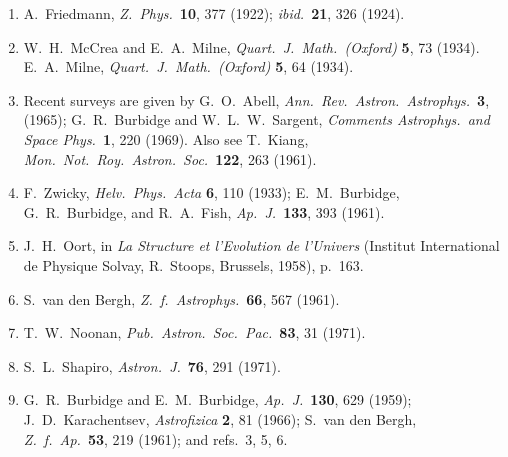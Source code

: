 \begin{enumerate}
  \item{}\label{ch15-ref-1}
  A.~Friedmann, \emph{Z.\ Phys.}\ \textbf{10}, 377 (1922);
  \emph{ibid.}\ \textbf{21}, 326 (1924).

  \item{}\label{ch15-ref-2}
  W.~H.~McCrea and E.~A.~Milne,
  \emph{Quart.\ J.\ Math.\ (Oxford)} \textbf{5}, 73 (1934).
  E.~A.~Milne, \emph{Quart.\ J.\ Math.\ (Oxford)} \textbf{5}, 64 (1934).

  \item{}\label{ch15-ref-3}
  Recent surveys are given by G.~O.~Abell,
  \emph{Ann.\ Rev.\ Astron.\ Astrophys.}\ \textbf{3}, (1965);
  G.~R.~Burbidge and W.~L.~W.~Sargent,
  \emph{Comments Astrophys.\ and Space Phys.}\ \textbf{1}, 220 (1969).
  Also see T.~Kiang, \emph{Mon.\ Not.\ Roy.\ Astron.\ Soc.}\
  \textbf{122}, 263 (1961).

  \item{}\label{ch15-ref-4}
  F.~Zwicky, \emph{Helv.\ Phys.\ Acta} \textbf{6}, 110 (1933);
  E.~M.~Burbidge, G.~R.~Burbidge, and R.~A.~Fish,
  \emph{Ap.\ J.}\ \textbf{133}, 393 (1961).

  \item{}\label{ch15-ref-5}
  J.~H.~Oort, in \emph{La Structure et l'Evolution de l'Univers}
  (Institut International de Physique Solvay, R.~Stoops, Brussels, 1958),
  p.~163.

  \item{}\label{ch15-ref-6}
  S.~van den Bergh, \emph{Z.\ f.\ Astrophys.}\ \textbf{66}, 567 (1961).

  \item{}\label{ch15-ref-7}
  T.~W.~Noonan, \emph{Pub.\ Astron.\ Soc.\ Pac.}\ \textbf{83}, 31 (1971).

  \item[7a.]\label{ch15-ref-7a}
  S.~L.~Shapiro, \emph{Astron.\ J.}\ \textbf{76}, 291 (1971).

  \item{}\label{ch15-ref-8}
  G.~R.~Burbidge and E.~M.~Burbidge,
  \emph{Ap.\ J.}\ \textbf{130}, 629 (1959);
  J.~D.~Karachentsev, \emph{Astrofizica} \textbf{2}, 81 (1966);
  S.~van den Bergh, \emph{Z.\ f.\ Ap.}\ \textbf{53}, 219 (1961);
  and refs.~3, 5, 6.


\end{enumerate}

